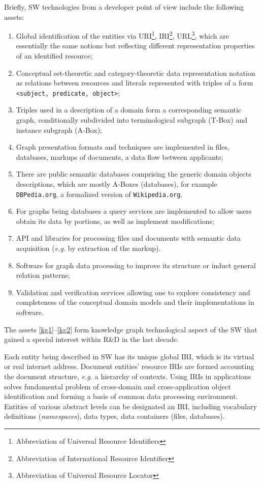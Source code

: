 \documentclass[
]{ceurart}
\begin{document}
Briefly, SW technologies from a developer point of view include the following assets:
\begin{enumerate}
\item Global identification of the entities via URI\footnote{Abbreviation of Universal Resource Identifiers}, IRI\footnote{Abbreviation of International Resource Identifier}, URL\footnote{Abbreviation of Universal Resource Locator}, which are essentially the same notions but reflecting different representation properties of an identified resource;
\item Conceptual set-theoretic and category-theoretic data representation notation as relations between resources and literals represented with triples of a form \texttt{<subject, predicate, object>};
\item Triples used in a description of a domain form a corresponding semantic graph, conditionally subdivided into terminological subgraph (T-Box) and instance subgraph (A-Box);
\item Graph presentation formats and techniques are implemented in files, databases, markups of documents, a data flow between applicants; \label{kg1}
\item There are public semantic databases comprising the generic domain objects descriptions, which are mostly A-Boxes (databases), for example \texttt{DBPedia.org}, a formalized version of \texttt{Wikipedia.org}. %
\item For graphs being databases a query services are implemented to allow users obtain its data by portions, as well as implement modifications;
\item API and libraries for processing files and documents with semantic data acquisition (\emph{e.g.} by extraction of the markup).
\item Software for graph data processing to improve its structure or induct general relation patterns;
\item Validation and verification services allowing one to explore consistency and completeness of the conceptual domain models and their implementations in software. \label{kg2}
\end{enumerate}
The assets \ref{kg1}--\ref{kg2} form knowledge graph technological aspect of the SW that gained a special interest within R\&D in the last decade.

Each entity being described in SW has its unique global IRI, which is its virtual or real internet address.  Document entities' resource IRIs are formed accounting the document structure, \emph{e.g.} a hierarchy of contexts.  Using IRIs in applications solves fundamental problem of cross-domain and cross-application object identification and forming a basis of common data processing environment.  Entities of various abstract levels can be designated an IRI, including vocabulary definitions (\emph{namespaces}), data types, data containers (files, databases).
\end{document}

